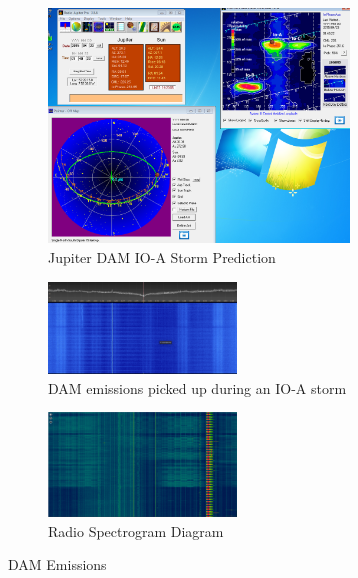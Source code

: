 %
\begin{figure}	
	\centering
	\begin{subfigure}[t]{8cm}
		\centering
		\includegraphics[width=8cm]{images/52}
		\caption{Jupiter \gls{DAM} IO-A Storm Prediction}\label{fig:dam_emissions_io_a_april_23_prediction}		
	\end{subfigure}
	\quad
	\begin{subfigure}[t]{5cm}
		\centering
		\includegraphics[width=5cm]{images/54}
		\caption{\gls{DAM} emissions picked up during an IO-A storm}
		\label{fig:dam_emissions_io_a_april_23}
	\end{subfigure}
	\quad
	\begin{subfigure}[t]{5cm}
		\centering
		\includegraphics[width=5cm]{images/55}
		\caption{Radio Spectrogram Diagram \citep{superkuh-15}}
		\label{fig:wide_radio_spectrogram}
	\end{subfigure}
	\caption{DAM Emissions}
	\label{fig:jupiter_dam_emissions}
\end{figure}
%